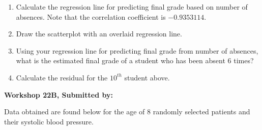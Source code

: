 \documentclass[11pt, chapterprefix=true]{scrbook}\usepackage[]{graphicx}\usepackage[]{color}
\begin{document}
\begin{exercises}
\begin{exercise}
\begin{enumerate}
  \item Calculate the regression line for predicting final grade based on number of absences.  Note that the correlation coefficient is $-0.9353114$. 
	\item Draw the scatterplot with an overlaid regression line.
	\item Using your regression line for predicting final grade from number of absences, what is the estimated final grade of a student who has been absent 6 times?
	\item Calculate the residual for the $10^{th}$ student above.
\end{enumerate}

\end{exercise}
\begin{solution}  %

\end{solution}


\clearpage

    \begin{exercise}  %

    \begin{center}
\begin{flushleft}\textbf{\large \hfill Workshop 22B, Submitted by: }\end{flushleft}

\end{center}

Data obtained are found below for the age of 8 randomly selected patients and their systolic blood pressure.


\end{exercise}
\end{exercises}
\end{document}
